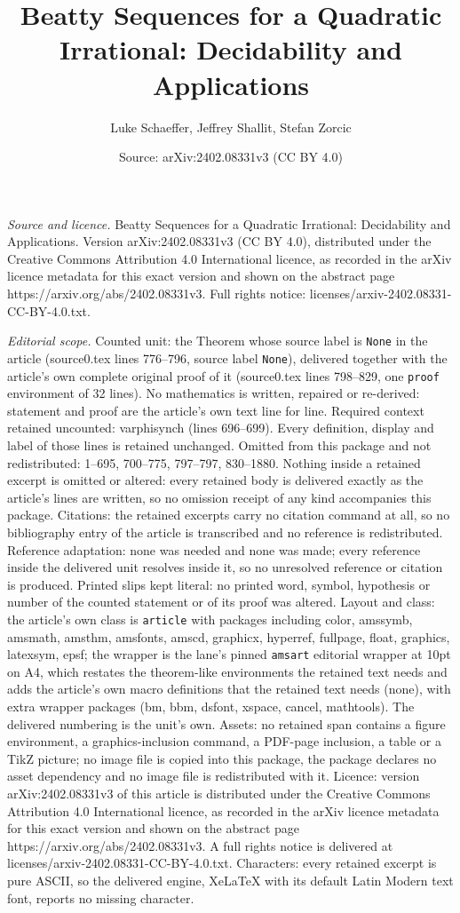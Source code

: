 \documentclass[10pt,a4paper]{amsart}
\title[Beatty Sequences for a Quadratic Irrational: Decidability an]{Beatty Sequences for a Quadratic Irrational: Decidability and Applications}
\author{Luke Schaeffer, Jeffrey Shallit, Stefan Zorcic}
\date{Source: arXiv:2402.08331v3 (CC BY 4.0)}
\begin{document}
\maketitle

\noindent\emph{Source and licence.} Beatty Sequences for a Quadratic Irrational: Decidability and Applications. Version arXiv:2402.08331v3 (CC BY 4.0), distributed under the Creative Commons Attribution 4.0 International licence, as recorded in the arXiv licence metadata for this exact version and shown on the abstract page https://arxiv.org/abs/2402.08331v3. Full rights notice: licenses/arxiv-2402.08331-CC-BY-4.0.txt.\par\smallskip

\noindent\textit{Editorial scope.} Counted unit: the Theorem whose source label is \texttt{None} in the article (source0.tex lines 776--796, source label \texttt{None}), delivered together with the article's own complete original proof of it (source0.tex lines 798--829, one \texttt{proof} environment of 32 lines). No mathematics is written, repaired or re-derived: statement and proof are the article's own text line for line. Required context retained uncounted: varphisynch (lines 696--699). Every definition, display and label of those lines is retained unchanged. Omitted from this package and not redistributed: 1--695, 700--775, 797--797, 830--1880. Nothing inside a retained excerpt is omitted or altered: every retained body is delivered exactly as the article's lines are written, so no omission receipt of any kind accompanies this package. Citations: the retained excerpts carry no citation command at all, so no bibliography entry of the article is transcribed and no reference is redistributed. Reference adaptation: none was needed and none was made; every reference inside the delivered unit resolves inside it, so no unresolved reference or citation is produced. Printed slips kept literal: no printed word, symbol, hypothesis or number of the counted statement or of its proof was altered. Layout and class: the article's own class is \texttt{article} with packages including color, amssymb, amsmath, amsthm, amsfonts, amscd, graphicx, hyperref, fullpage, float, graphics, latexsym, epsf; the wrapper is the lane's pinned \texttt{amsart} editorial wrapper at 10pt on A4, which restates the theorem-like environments the retained text needs and adds the article's own macro definitions that the retained text needs (none), with extra wrapper packages (bm, bbm, dsfont, xspace, cancel, mathtools). The delivered numbering is the unit's own. Assets: no retained span contains a figure environment, a graphics-inclusion command, a PDF-page inclusion, a table or a TikZ picture; no image file is copied into this package, the package declares no asset dependency and no image file is redistributed with it. Licence: version arXiv:2402.08331v3 of this article is distributed under the Creative Commons Attribution 4.0 International licence, as recorded in the arXiv licence metadata for this exact version and shown on the abstract page https://arxiv.org/abs/2402.08331v3. A full rights notice is delivered at licenses/arxiv-2402.08331-CC-BY-4.0.txt. Characters: every retained excerpt is pure ASCII, so the delivered engine, XeLaTeX with its default Latin Modern text font, reports no missing character.
\end{document}
